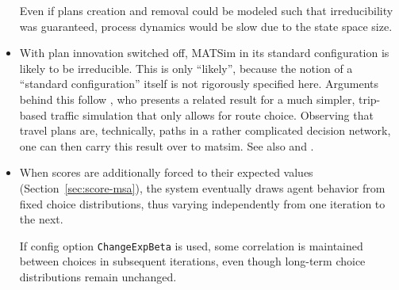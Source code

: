 \begin{itemize}
Even if plans creation and removal could be modeled such that irreducibility was
guaranteed,  process dynamics would be slow due to
the state space size.



\item With plan innovation switched off, MATSim in its standard configuration is
likely to
be irreducible.  This is only {}``likely'', because the notion of a {}``standard
configuration'' itself is not rigorously specified here. Arguments behind this
follow \citet{cascetta-1989}, who presents a related result for a much simpler,
trip-based traffic simulation that only allows for route choice. Observing that
travel plans are, technically, paths in a rather complicated decision network,
one can then carry this result over to \gls{matsim}. See also
\citet{NagelEtc2000tristan-succ} and \citet{floetteroed-2010e}.





\item When scores are additionally forced to their 
expected values (Section~\ref{sec:score-msa}), the system eventually draws
agent behavior from fixed choice distributions, thus varying independently
from one iteration to the next.

If config option \lstinline|ChangeExpBeta| is used, some
correlation is maintained between choices in subsequent iterations, 
even though  long-term choice distributions remain unchanged.

\end{itemize}

